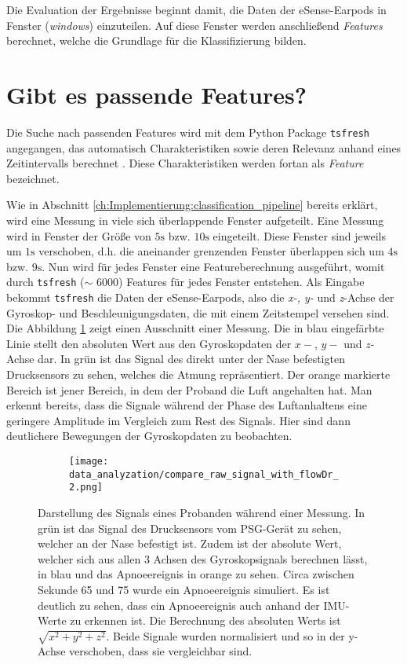 Die Evaluation der Ergebnisse beginnt damit, die Daten der eSense-Earpods in Fenster (\textit{windows}) einzuteilen.
Auf diese Fenster werden anschließend \textit{Features} berechnet, welche die Grundlage für die Klassifizierung bilden.

\newpage 

\section{Gibt es passende Features?}
Die Suche nach passenden Features wird mit dem Python Package \texttt{tsfresh} angegangen, das automatisch Charakteristiken sowie deren Relevanz anhand eines Zeitintervalls berechnet \cite{TsfreshTsfresh12}.
Diese Charakteristiken werden fortan als \textit{Feature} bezeichnet.

Wie in Abschnitt \ref{ch:Implementierung:classification_pipeline} bereits erklärt, wird eine Messung in viele sich überlappende Fenster aufgeteilt. 
Eine Messung wird in Fenster der Größe von $5\si{\s}$ bzw. $10\si{\s}$ eingeteilt.
Diese Fenster sind jeweils um $1\si{\s}$ verschoben, d.h. die aneinander grenzenden Fenster überlappen sich um $4\si{\s}$ bzw. $9\si{\s}$.
Nun wird für jedes Fenster eine Featureberechnung ausgeführt, womit durch \texttt{tsfresh} ($\sim$ 6000) Features für jedes Fenster entstehen.
Als Eingabe bekommt \texttt{tsfresh} die Daten der eSense-Earpods, also die \textit{x-, y-} und \textit{z}-Achse der Gyroskop- und Beschleunigungsdaten, die mit einem Zeitstempel versehen sind. 
Die Abbildung \ref{evaluation:rawPlot} zeigt einen Ausschnitt einer Messung. 
Die in blau eingefärbte Linie stellt den absoluten Wert aus den Gyroskopdaten der $x-$, $y-$ und $z$-Achse dar.
In grün ist das Signal des direkt unter der Nase befestigten Drucksensors zu sehen, welches die Atmung repräsentiert.
Der orange markierte Bereich ist jener Bereich, in dem der Proband die Luft angehalten hat. 
Man erkennt bereits, dass die Signale während der Phase des Luftanhaltens eine geringere Amplitude im Vergleich zum Rest des Signals.
Hier sind dann deutlichere Bewegungen der Gyroskopdaten zu beobachten. 

\begin{figure}[ht]
  \centering
  \begin{subfigure}{0.7\textwidth}
      \texttt{[image: data\_analyzation/compare\_raw\_signal\_with\_flowDr\_2.png]}
    \end{subfigure}
  \caption{Darstellung des Signals eines Probanden während einer Messung. In grün ist das Signal des Drucksensors vom PSG-Gerät zu sehen, welcher an der Nase befestigt ist. Zudem ist der absolute Wert, welcher sich aus allen 3 Achsen des Gyroskopsignals berechnen lässt, in blau und das Apnoeereignis in orange zu sehen. Circa zwischen Sekunde 65 und 75 wurde ein Apnoeereignis simuliert. Es ist deutlich zu sehen, dass ein Apnoeereignis auch anhand der IMU-Werte zu erkennen ist. Die Berechnung des absoluten Werts ist $\sqrt{x^2+y^2+z^2}$. Beide Signale wurden normalisiert und so in der y-Achse verschoben, dass sie vergleichbar sind.}
  \label{evaluation:rawPlot}
\end{figure}

